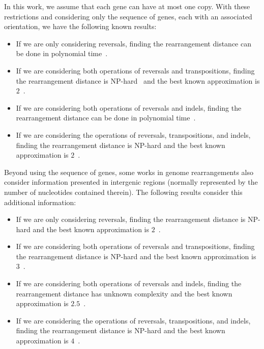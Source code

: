 \documentclass[12pt]{article}
\begin{document}
In this work, we assume that each gene can have at most one copy. With these restrictions and considering only the sequence of genes, each with an associated orientation, we have the following known results:
\begin{itemize}
    \item If we are only considering reversals, finding the rearrangement distance can be done in polynomial time~\cite{1999-hannenhalli-pevzner}.
    \item If we are considering both operations of reversals and transpositions, finding the rearrangement distance is NP-hard~\cite{2019b-oliveira-etal} and the best known approximation is $2$~\cite{1998-walter-etal}.
    \item If we are considering both operations of reversals and indels, finding the rearrangement distance can be done in polynomial time~\cite{2021-willing-etal}.
    \item If we are considering the operations of reversals, transpositions, and indels, finding the rearrangement distance is NP-hard and the best known approximation is $2$~\cite{2022a-alexandrino-etal,2023-alexandrino-etal}.
\end{itemize}

Beyond using the sequence of genes, some works in genome rearrangements also consider information presented in intergenic regions (normally represented by the number of nucleotides contained therein). The following results consider this additional information:
\begin{itemize}
    \item If we are only considering reversals, finding the rearrangement distance is NP-hard and the best known approximation is $2$~\cite{2021b-oliveira-etal}.
    \item If we are considering both operations of reversals and transpositions, finding the rearrangement distance is NP-hard and the best known approximation is $3$~\cite{2021a-oliveira-etal}.
    \item If we are considering both operations of reversals and indels, finding the rearrangement distance has unknown complexity and the best known approximation is $2.5$~\cite{2022b-alexandrino-etal}.
    \item If we are considering the operations of reversals, transpositions, and indels, finding the rearrangement distance is NP-hard and the best known approximation is $4$~\cite{2023b-alexandrino-etal}.
\end{itemize}
\end{document}
